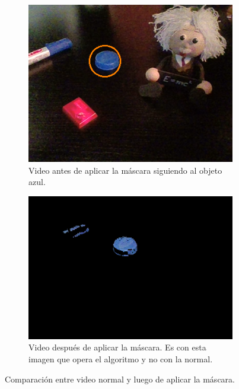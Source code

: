 \begin{figure}[H]
\centering
	\begin{subfigure}{.4\textwidth}
		\centering
		\includegraphics[width=\textwidth]{Imagenes/color1.png}
		\caption{Video antes de aplicar la máscara siguiendo al objeto azul.}
		\label{fig:col1}
	\end{subfigure}
	\begin{subfigure}{.4\textwidth}
		\centering
		\includegraphics[width=\textwidth]{Imagenes/color2.png}
		\caption{Video después de aplicar la máscara. Es con esta imagen que opera el algoritmo y no con la normal.}
		\label{fig:col2}
	\end{subfigure}
	\caption{Comparación entre video normal y luego de aplicar la máscara.}
	\label{fig:color_comp}
\end{figure}

